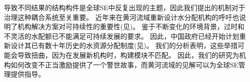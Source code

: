 导致不同结果的结构构件是全球SE中反复出现的主题，因此我们提出的机制对于治理这种耦合系统至关重要。
近年来在黄河流域重新设计水分配机构的呼吁也说明了机构解决方案对可持续性的重要性(见\textit{})。
鉴于不断变化的环境背景，过时和不灵活的水配额已不能满足可持续发展的要求\cite{wang2019a}。
因此，中国政府已经开始计划重新设计其已有数十年历史的水资源分配制度(见\textit{})。
我们的分析表明，这些举措可能会导致扭曲，因为在发展新机构\cite{bodin2017b}时，构建模块不匹配。
因此，我们的研究为机构如何改变不正当激励提供了一个警世故事\cite{hegwood2022}，而黄河流域的见解可以为全球SE管理提供指导\cite{muneepeerakul2017, leslie2015}。
